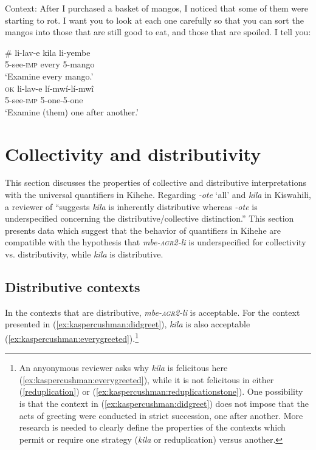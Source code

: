 \documentclass[output=paper,modfonts,nonflat]{langsci/langscibook}
\begin{document}
\begin{exe}

 \ex Context: After I purchased a basket of mangos, I noticed that some of them were starting to rot. I want you to look at each one carefully so that you can sort the mangos into those that are still good to eat, and those that are spoiled. I tell you: \label{ex:kaspercushman:onebyone} \\

\begin{xlist}

\ex 
\gll \# li-lav-e kila li-yembe \\
{} 5-see-\textsc{imp} every 5-mango \\
\glt `Examine every mango.' \\



\ex 
\gll \textsc{ok} li-lav-e lí-mwí-lí-mw\^i \\
{} 5-see-\textsc{imp} 5-one-5-one \\ \label{reduplication}
\glt `Examine (them) one after another.'

\end{xlist}
\end{exe}


\section{Collectivity and distributivity}

This section discusses the properties of collective and distributive interpretations with the universal quantifiers in Kihehe. 
Regarding \textit{-ote} `all' and \textit{kila} in Kiswahili, a reviewer of \citealt[p. 396]{zerbian08} ``suggests \textit{kila} is inherently distributive whereas \textit{-ote} is underspecified concerning the distributive/collective distinction.''  This section presents data which suggest that the behavior of quantifiers in Kihehe are compatible with the hypothesis that \textit{mbe-\textsc{agr2}-li} is underspecified for collectivity vs. distributivity, while \textit{kila} is distributive.

\subsection{Distributive contexts}

In the contexts that are distributive, \textit{mbe-\textsc{agr2}-li} is acceptable. For the context presented in (\ref{ex:kaspercushman:didgreet}), \textit{kila} is also acceptable (\ref{ex:kaspercushman:everygreeted}).\footnote{An anyonymous reviewer asks why \textit{kila} is felicitous here (\ref{ex:kaspercushman:everygreeted}), while it is not felicitous in either (\ref{reduplication}) or (\ref{ex:kaspercushman:reduplicationstone}). One possibility is that the context in (\ref{ex:kaspercushman:didgreet}) does not impose that the acts of greeting were conducted in strict succession, one after another.  More research is needed to clearly define the properties of the contexts which permit or require one strategy (\textit{kila} or reduplication) versus another.} 
\end{document}
